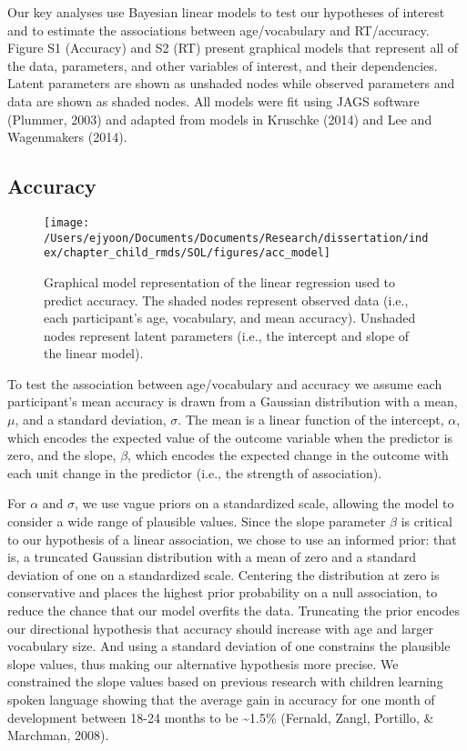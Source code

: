 \documentclass[oneside]{report}
\begin{document}
Our key analyses use Bayesian linear models to test our hypotheses of
interest and to estimate the associations between age/vocabulary and
RT/accuracy. Figure S1 (Accuracy) and S2 (RT) present graphical models
that represent all of the data, parameters, and other variables of
interest, and their dependencies. Latent parameters are shown as
unshaded nodes while observed parameters and data are shown as shaded
nodes. All models were fit using JAGS software (Plummer, 2003) and
adapted from models in Kruschke (2014) and Lee and Wagenmakers (2014).

\subsection{Accuracy}\label{accuracy}
\begin{figure}[!t]

{\centering \texttt{[image: /Users/ejyoon/Documents/Documents/Research/dissertation/index/chapter\_child\_rmds/SOL/figures/acc\_model]} 

}

\caption[Graphical representation of the accuracy model in Experiment 1.1.]{Graphical model representation of the linear regression used to predict accuracy. The shaded nodes represent observed data (i.e., each participant's age, vocabulary, and mean accuracy). Unshaded nodes represent latent parameters (i.e., the intercept and slope of the linear model).}\label{fig:unnamed-chunk-6}
\end{figure}
To test the association between age/vocabulary and accuracy we assume
each participant's mean accuracy is drawn from a Gaussian distribution
with a mean, \(\mu\), and a standard deviation, \(\sigma\). The mean is
a linear function of the intercept, \(\alpha\), which encodes the
expected value of the outcome variable when the predictor is zero, and
the slope, \(\beta\), which encodes the expected change in the outcome
with each unit change in the predictor (i.e., the strength of
association).

For \(\alpha\) and \(\sigma\), we use vague priors on a standardized
scale, allowing the model to consider a wide range of plausible values.
Since the slope parameter \(\beta\) is critical to our hypothesis of a
linear association, we chose to use an informed prior: that is, a
truncated Gaussian distribution with a mean of zero and a standard
deviation of one on a standardized scale. Centering the distribution at
zero is conservative and places the highest prior probability on a null
association, to reduce the chance that our model overfits the data.
Truncating the prior encodes our directional hypothesis that accuracy
should increase with age and larger vocabulary size. And using a
standard deviation of one constrains the plausible slope values, thus
making our alternative hypothesis more precise. We constrained the slope
values based on previous research with children learning spoken language
showing that the average gain in accuracy for one month of development
between 18-24 months to be \textasciitilde{}1.5\% (Fernald, Zangl,
Portillo, \& Marchman, 2008).
\end{document}
